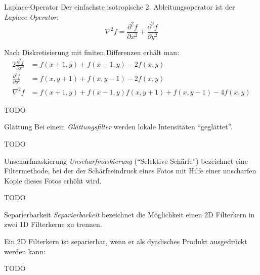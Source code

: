 \begin{example}{Laplace-Operator}
    Der einfachste isotropische 2. Ableitungsoperator ist der \emph{Laplace-Operator}:
    \[
        \nabla^2 f = \frac{\partial^2 f}{\partial x^2} + \frac{\partial^2 f}{\partial y^2}
    \]

    Nach Diskretisierung mit finiten Differenzen erhält man:
    \begin{alignat*}{2}
        \frac{\partial^2 f}{\partial x^2} & = f(x + 1, y) + f(x - 1, y) - 2 f(x, y)                           \\
        \frac{\partial^2 f}{\partial y^2} & = f(x, y + 1) + f(x, y - 1) - 2 f(x, y)                           \\
        \nabla^2 f                        & = f(x + 1, y) + f(x - 1, y) f(x, y + 1) + f(x, y - 1) - 4 f(x, y)
    \end{alignat*}

    TODO
\end{example}

\begin{defi}[Filter]{Glättung}
    Bei einem \emph{Glättungsfilter} werden lokale Intensitäten \enquote{geglättet}.

    TODO
\end{defi}

\begin{defi}[Filter]{Unscharfmaskierung}
    \emph{Unscharfmaskierung} (\enquote{Selektive Schärfe}) bezeichnet eine Filtermethode, bei der der Schärfeeindruck eines Fotos mit Hilfe einer unscharfen Kopie dieses Fotos erhöht wird.

    TODO
\end{defi}

\begin{defi}{Separierbarkeit}
    \emph{Separierbarkeit} bezeichnet die Möglichkeit einen 2D Filterkern in zwei 1D Filterkerne zu trennen.

    Ein 2D Filterkern ist separierbar, wenn er als dyadisches Produkt ausgedrückt werden kann:

    TODO
\end{defi}


